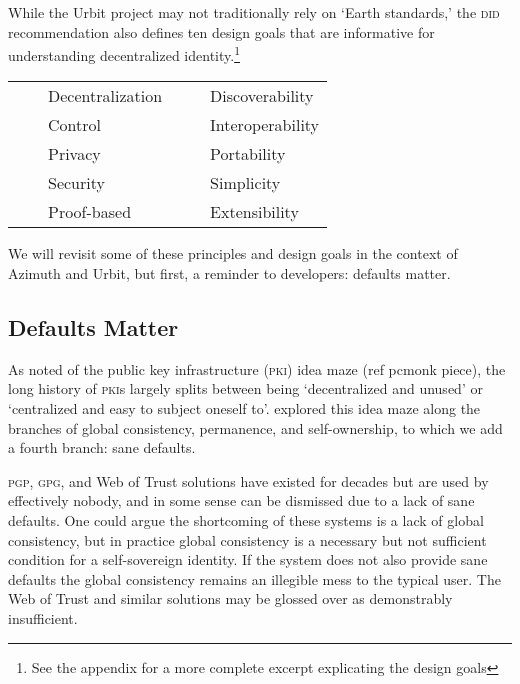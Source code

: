 \documentclass[twoside]{article}
\newcommand{\tabitem}{~~\llap{\textbullet}~~}
\begin{document}
While the Urbit project may not traditionally rely on `Earth standards,' the \textsc{did} recommendation also defines ten design goals that are informative for understanding decentralized identity.\footnote{See the appendix for a more complete excerpt explicating the design goals}

\begin{tabular}{ll}
  \tabitem  Decentralization
  &
  \tabitem  Discoverability \\
  \tabitem  Control
  &
  \tabitem  Interoperability \\
  \tabitem  Privacy
  &
  \tabitem  Portability \\
  \tabitem  Security
  &
  \tabitem  Simplicity \\
  \tabitem  Proof-based
  &
  \tabitem  Extensibility \\
\end{tabular}

We will revisit some of these principles and design goals in the context of Azimuth and Urbit, but first, a reminder to developers: defaults matter.

\subsection{Defaults Matter}

As  noted of the public key infrastructure (\textsc{pki}) idea maze (ref pcmonk piece), the long history of \textsc{pki}s largely splits between being `decentralized and unused' or `centralized and easy to subject oneself to'.   explored this idea maze along the branches of global consistency, permanence, and self-ownership, to which we add a fourth branch: sane defaults.

\textsc{pgp}, \textsc{gpg}, and Web of Trust solutions have existed for decades but are used by effectively nobody, and in some sense can be dismissed due to a lack of sane defaults. One could argue the shortcoming of these systems is a lack of global consistency, but in practice global consistency is a necessary but not sufficient condition for a self-sovereign identity. If the system does not also provide sane defaults the global consistency remains an illegible mess to the typical user. The Web of Trust and similar solutions may be glossed over as demonstrably insufficient.
\end{document}
